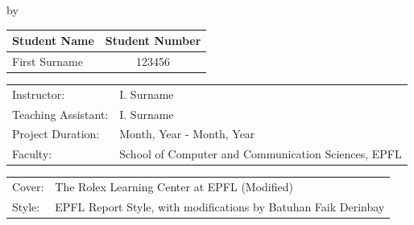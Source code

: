 \begin{titlepage}

\begin{center}

{\makeatletter
\largetitlestyle\fontsize{45}{45}\selectfont\@title
\makeatother}

{\makeatletter
\ifdefvoid{\@subtitle}{}{\bigskip\fontsize{20}{20}\selectfont\@subtitle}
\makeatother}

\bigskip
\bigskip

by

\bigskip
\bigskip

{\makeatletter
\largetitlestyle\fontsize{25}{25}\selectfont\@author
\makeatother}

\bigskip
\bigskip

\setlength\extrarowheight{2pt}
\begin{tabular}{lc}
    Student Name & Student Number \\\midrule
    First Surname & 123456 \\
\end{tabular}

\vfill

\begin{tabular}{ll}
    Instructor: & I. Surname \\
    Teaching Assistant: & I. Surname \\
    Project Duration: & Month, Year - Month, Year \\
    Faculty: & School of Computer and Communication Sciences, EPFL
\end{tabular}

\bigskip
\bigskip

\begin{tabular}{p{15mm}p{10cm}}
    Cover: & The Rolex Learning Center at EPFL (Modified) \\
    Style: & EPFL Report Style, with modifications by Batuhan Faik Derinbay
\end{tabular}

\end{center}


\end{titlepage}
